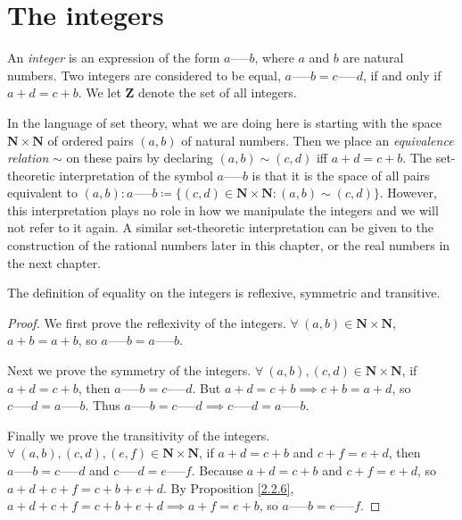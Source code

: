 \section{The integers}\label{sec 4.1}

\begin{definition}[Integers]\label{4.1.1}
An \emph{integer} is an expression of the form \(a \text{-----} b\), where \(a\) and \(b\) are natural numbers.
Two integers are considered to be equal, \(a \text{-----} b = c \text{-----} d\), if and only if \(a + d = c + b\).
We let \(\mathbf{Z}\) denote the set of all integers.
\end{definition}

\begin{note}
In the language of set theory, what we are doing here is starting with the space \(\mathbf{N} \times \mathbf{N}\) of ordered pairs \((a, b)\) of natural numbers.
Then we place an \emph{equivalence relation} \(\sim\) on these pairs by declaring \((a, b) \sim (c, d)\) iff \(a + d = c + b\).
The set-theoretic interpretation of the symbol \(a \text{-----} b\) is that it is the space of all pairs equivalent to \((a, b): a \text{-----} b \coloneqq \{(c, d) \in \mathbf{N} \times \mathbf{N} : (a, b) \sim (c, d)\}\).
However, this interpretation plays no role in how we manipulate the integers and we will not refer to it again.
A similar set-theoretic interpretation can be given to the construction of the rational numbers later in this chapter, or the real numbers in the next chapter.
\end{note}

\begin{additional corollary}\label{ac 4.1.1}
The definition of equality on the integers is reflexive, symmetric and transitive.
\end{additional corollary}

\begin{proof}
We first prove the reflexivity of the integers.
\(\forall\ (a, b) \in \mathbf{N} \times \mathbf{N}\), \(a + b = a + b\), so \(a \text{-----} b = a \text{-----} b\).

Next we prove the symmetry of the integers.
\(\forall\ (a, b), (c, d) \in \mathbf{N} \times \mathbf{N}\), if \(a + d = c + b\), then \(a \text{-----} b = c \text{-----} d\).
But \(a + d = c + b \implies c + b = a + d\), so \(c \text{-----} d = a \text{-----} b\).
Thus \(a \text{-----} b = c \text{-----} d \implies c \text{-----} d = a \text{-----} b\).

Finally we prove the transitivity of the integers.
\(\forall\ (a, b), (c, d), (e, f) \in \mathbf{N} \times \mathbf{N}\), if \(a + d = c + b\) and \(c + f = e + d\), then \(a \text{-----} b = c \text{-----} d\) and \(c \text{-----} d = e \text{-----} f\).
Because \(a + d = c + b\) and \(c + f = e + d\), so \(a + d + c + f = c + b + e + d\).
By Proposition \ref{2.2.6}, \(a + d + c + f = c + b + e + d \implies a + f = e + b\), so \(a \text{-----} b = e \text{-----} f\).
\end{proof}

